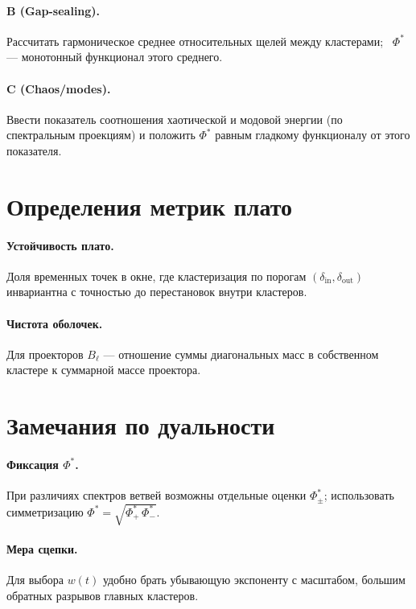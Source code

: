 \documentclass[a4paper,12pt]{article}
\begin{document}
\paragraph{B (Gap-sealing).} Рассчитать гармоническое среднее относительных щелей между кластерами; \ $\Phi^\ast$ --- монотонный функционал этого среднего.
\paragraph{C (Chaos/modes).} Ввести показатель соотношения хаотической и модовой энергии (по спектральным проекциям) и положить $\Phi^\ast$ равным гладкому функционалу от этого показателя.

\section{Определения метрик плато}
\paragraph{Устойчивость плато.} Доля временных точек в окне, где кластеризация по порогам $(\delta_{\mathrm{in}},\delta_{\mathrm{out}})$ инвариантна с точностью до перестановок внутри кластеров.
\paragraph{Чистота оболочек.} Для проекторов $B_\ell$ --- отношение суммы диагональных масс в собственном кластере к суммарной массе проектора.

\section{Замечания по дуальности}
\paragraph{Фиксация $\Phi^\ast$.} При различиях спектров ветвей возможны отдельные оценки $\Phi^\ast_\pm$; использовать симметризацию $\Phi^\ast=\sqrt{\Phi^\ast_+\,\Phi^\ast_-}$.
\paragraph{Мера сцепки.} Для выбора $w(t)$ удобно брать убывающую экспоненту с масштабом, большим обратных разрывов главных кластеров.
\end{document}
